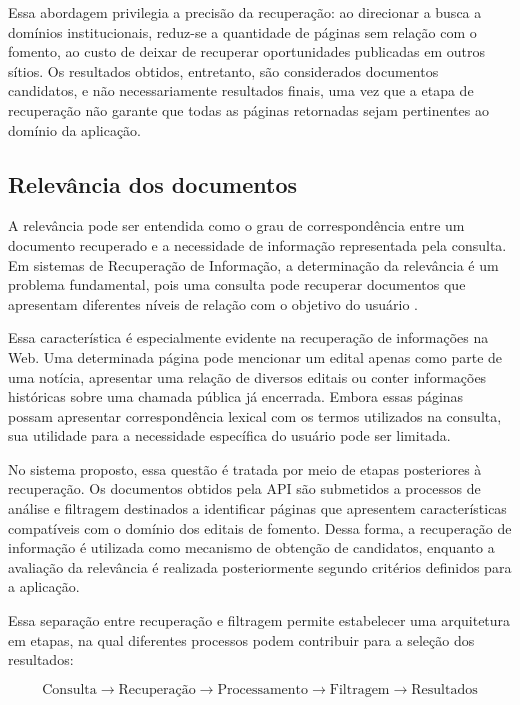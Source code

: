 Essa abordagem privilegia a precisão da recuperação: ao direcionar a busca a domínios institucionais, reduz-se a quantidade de páginas sem relação com o fomento, ao custo de deixar de recuperar oportunidades publicadas em outros sítios. Os resultados obtidos, entretanto, são considerados documentos candidatos, e não necessariamente resultados finais, uma vez que a etapa de recuperação não garante que todas as páginas retornadas sejam pertinentes ao domínio da aplicação.

\subsection{Relevância dos documentos}

A relevância pode ser entendida como o grau de correspondência entre um documento recuperado e a necessidade de informação representada pela consulta. Em sistemas de Recuperação de Informação, a determinação da relevância é um problema fundamental, pois uma consulta pode recuperar documentos que apresentam diferentes níveis de relação com o objetivo do usuário \cite{baeza2011}.

Essa característica é especialmente evidente na recuperação de informações na Web. Uma determinada página pode mencionar um edital apenas como parte de uma notícia, apresentar uma relação de diversos editais ou conter informações históricas sobre uma chamada pública já encerrada. Embora essas páginas possam apresentar correspondência lexical com os termos utilizados na consulta, sua utilidade para a necessidade específica do usuário pode ser limitada.

No sistema proposto, essa questão é tratada por meio de etapas posteriores à recuperação. Os documentos obtidos pela API são submetidos a processos de análise e filtragem destinados a identificar páginas que apresentem características compatíveis com o domínio dos editais de fomento. Dessa forma, a recuperação de informação é utilizada como mecanismo de obtenção de candidatos, enquanto a avaliação da relevância é realizada posteriormente segundo critérios definidos para a aplicação.

Essa separação entre recuperação e filtragem permite estabelecer uma arquitetura em etapas, na qual diferentes processos podem contribuir para a seleção dos resultados:

\begin{equation}
\text{Consulta}
\rightarrow
\text{Recuperação}
\rightarrow
\text{Processamento}
\rightarrow
\text{Filtragem}
\rightarrow
\text{Resultados}
\end{equation}

